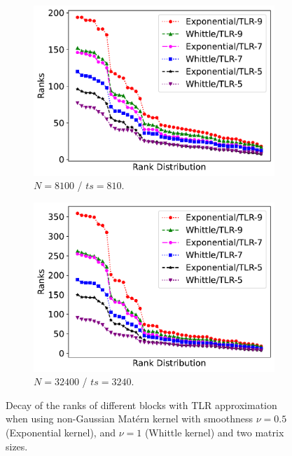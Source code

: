 \documentclass[conference]{IEEEtran}
\begin{document}
\begin{figure}
     \centering
     \begin{subfigure}[b]{0.23\textwidth}
         \centering
         \includegraphics[width=\textwidth]{./figures/ranks-decay-8100.pdf}
         \caption{$N = 8100$ / $ts = 810$.}
         \label{fig:tlr-8100}
     \end{subfigure}
     \begin{subfigure}[b]{0.23\textwidth}
         \centering
         \includegraphics[width=\textwidth]{./figures/ranks-decay-32400.pdf}
         \caption{$N = 32400$ / $ts = 3240$.}
         \label{fig:tlr-32400}
     \end{subfigure}
        \caption{Decay of the ranks of different blocks with TLR approximation when using non-Gaussian Mat\'ern kernel with smoothness $\nu =0.5$ (Exponential kernel), and $\nu=1$ (Whittle kernel) and two matrix sizes.}
        \label{fig:tlr-deacy}
\end{figure}
\end{document}
